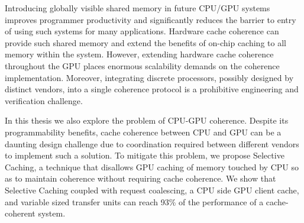 
Introducing globally visible shared memory in future CPU/GPU systems improves
programmer productivity and significantly reduces the barrier to entry of using
such systems for many applications.  Hardware cache coherence can provide such
shared memory and extend the benefits of on-chip caching to all memory within
the system.  However, extending hardware cache coherence throughout the GPU
places enormous scalability demands on the coherence implementation.  Moreover,
integrating discrete processors, possibly designed by distinct vendors, into a
single coherence protocol is a prohibitive engineering and verification
challenge.  

In this thesis we also explore the problem of CPU-GPU coherence. Despite its
programmability benefits, cache coherence between CPU and GPU can be a daunting
design challenge due to coordination required between different vendors to
implement such a solution. To mitigate this problem, we propose Selective
Caching, a technique that disallows GPU caching of memory touched by CPU so as
to maintain coherence without requiring cache coherence. We show that Selective
Caching coupled with request coalescing, a CPU side GPU client cache, and
variable sized transfer units can reach 93\% of the performance of a
cache-coherent system.
%

